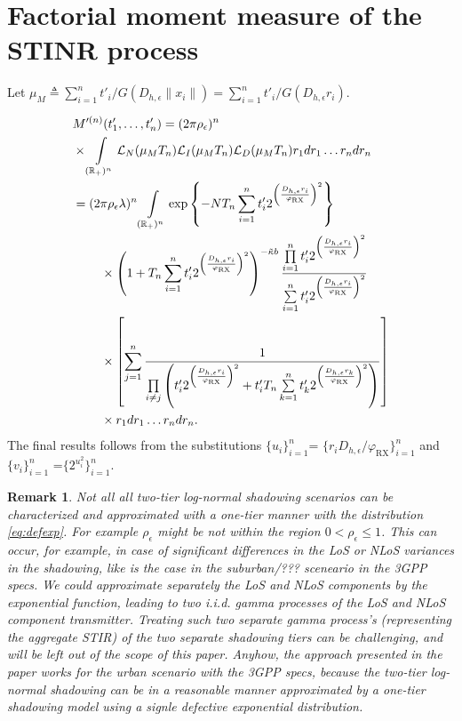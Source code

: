 \documentclass[lettersize,journal]{IEEEtran}
\newcommand{\R}{\mathbb{R}}
\newtheorem*{remark}{Remark}
\begin{document}
\appendices

\section{Factorial moment measure of the STINR process}
Let $\mu_M \triangleq \sum_{i=1}^nt'_i/G(D_{h,\epsilon}\|x_i\|)=\sum_{i=1}^nt'_i/G(D_{h,\epsilon} r_i)$.

\begin{align}
  &M'^{(n)}(t'_1,\dots,t'_n) =(2 \pi \rho_{\epsilon})^n\nonumber\\
  & \times\int\limits_{(\R_+)^n} \mathcal{L}_N(\mu_MT_n)\mathcal{L}_I(\mu_MT_n)\mathcal{L}_D(\mu_MT_n) r_1 dr_1 \dots r_n dr_n\nonumber \\
  &=(2 \pi \rho_{\epsilon} \lambda)^n \int\limits_{(\R_+)^n} \exp\left\{-NT_n\sum\limits_{i=1}^nt'_i2^{\left(\frac{D_{h,\epsilon}r_i}{\varphi_{\text{RX}}}\right)^2}\right\} \nonumber\\
  &\hspace{0.8cm}\times\left(1+T_n\sum\limits_{i=1}^nt'_i2^{\left(\frac{D_{h,\epsilon}r_i}{\varphi_{\text{RX}}}\right)^2}\right)^{- \tilde{\kappa}b} \frac{\prod\limits_{i=1}^nt'_i2^{\left(\frac{D_{h,\epsilon}r_i}{\varphi_{\text{RX}}}\right)^2}}{\sum\limits_{i=1}^nt'_i2^{\left(\frac{D_{h,\epsilon}r_i}{\varphi_{\text{RX}}}\right)^2}} \nonumber\\
  &\hspace{0.8cm}\times  \left[\sum\limits_{j=1}^n\frac{1}{\prod\limits_{i\neq j}\left(t'_i 2^{\left(\frac{D_{h,\epsilon}r_i}{\varphi_{\text{RX}}}\right)^2}+ t_i'T_n\sum\limits_{k=1}^nt'_k2^{\left(\frac{D_{h,\epsilon}r_k}{\varphi_{\text{RX}}}\right)^2} \right)} \right] \nonumber\\
  &\hspace{0.8cm}\times r_1 dr_1 \dots r_n dr_n.
\end{align}
The final results follows from the substitutions $\{u_i\}_{i= 1}^n$= $\{r_i D_{h,\epsilon}/\varphi_{\text{RX}}\}_{i= 1}^n$ and $\{v_i\}_{i= 1}^n$ =$\{ 2^{u^2_i}\}_{i= 1}^n$.





\begin{remark}
  Not all all two-tier log-normal shadowing scenarios can be characterized and approximated with a one-tier manner with the distribution \eqref{eq:defexp}. For example $\rho_{\epsilon}$ might be not within the region $0<\rho_{\epsilon} \leq 1$. This can occur, for example, in case of significant differences in the LoS or NLoS variances in the shadowing, like is the case in the suburban/??? sceneario in the 3GPP specs. We could approximate separately the LoS and NLoS components by the exponential function, leading to two i.i.d. gamma processes of the LoS and NLoS component transmitter. Treating such two separate gamma process's (representing the aggregate STIR) of the two separate shadowing tiers can be challenging, and will be left out of the scope of this paper. Anyhow, the approach presented in the paper works for the urban scenario with the 3GPP specs, because the two-tier log-normal shadowing can be in a reasonable manner approximated by a one-tier shadowing model using a signle defective exponential distribution.
\end{remark}



%

\end{document}
